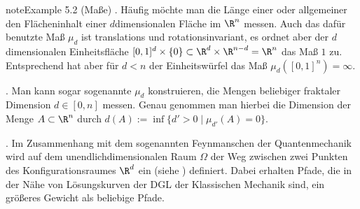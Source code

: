 \documentclass[letterpaper,10pt,german]{jupyterBook}
\begin{document}
\begin{sphinxadmonition}{note}{Example 5.2 (Maße)}
. Häufig möchte man die Länge einer  oder allgemeiner den Flächeninhalt einer \(d\)\sphinxhyphen{}dimensionalen Fläche im \(\R^n\) messen.
Auch das dafür benutzte Maß \(\mu_d\) ist translations\sphinxhyphen{} und rotationsinvariant, es ordnet aber der \(d\)\sphinxhyphen{}dimensionalen Einheitsfläche \([0,1]^d\times\{0\} \subset\R^d\times\R^{n-d}=\R^n\) das Maß \(1\) zu.
Entsprechend hat aber für \(d<n\) der Einheitswürfel das Maß \(\mu_d([0,1]^n)=\infty\).

. Man kann sogar sogenannte  \(\mu_d\) konstruieren, die Mengen beliebiger fraktaler Dimension \(d\in[0,n]\) messen.
Genau genommen  man hierbei die Dimension der Menge \(A\subset \R^n\) durch \(d(A):=\inf\{d'>0\mid \mu_{d'}(A)=0\}.\)

. Im Zusammenhang mit dem sogenannten Feynmanschen  der Quantenmechanik wird auf dem unendlich\sphinxhyphen{}dimensionalen Raum \(\Omega\) der Weg zwischen zwei Punkten des Konfigurationsraumes \(\R^d\) ein  (siehe {\hyperref[\detokenize{masstheorie/masstheorie:rem:wahrscheinlichkeitsmass}]{}}) definiert.
Dabei erhalten Pfade, die in der Nähe von Lösungskurven der DGL der Klassischen Mechanik sind, ein größeres Gewicht als beliebige Pfade.
\end{sphinxadmonition}
\end{document}

